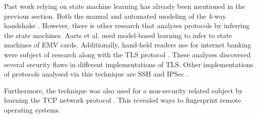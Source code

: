 Past work relying on state machine learning has already been mentioned in the previous section. Both the manual and automated modeling of the 4-way handshake \cite{Vanhoef:2017,Stone:2018}. However, there is other research that analyses protocols by inferring the state machines. Aarts et al. \cite{Aarts:2013} used model-based learning to infer to state machines of EMV cards. Additionally, hand-held readers use for internet banking were subject of research \cite{Chalupar:2014} along with the TLS protocol \cite{Ruiter:2015,Thoor:2018}. These analyses discovered several security flaws in different implementations of TLS. Other implementations of protocols analysed via this technique are SSH \cite{Brostean:2017,Tijssen:2015} and IPSec \cite{Veldhuizen:2017}.

Furthermore, the technique was also used for a non-security related subject by learning the TCP network protocol \cite{Brostean:2014}. This revealed ways to fingerprint remote operating systems.